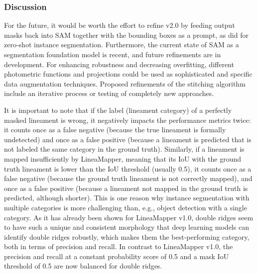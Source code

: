\subsubsection{Discussion}\label{sec:discussing_lineaMapperv1.1}
For the future, it would be worth the effort to refine v2.0 by feeding output masks back into SAM together with the bounding boxes as a prompt, as did for zero-shot instance segmentation. Furthermore, the current state of SAM as a segmentation foundation model is recent, and future refinements are in development.
For enhancing robustness and decreasing overfitting, different photometric functions and projections could be used as sophisticated and specific data augmentation techniques. Proposed refinements of the stitching algorithm include an iterative process or testing of completely new approaches. 

It is important to note that if the label (lineament category) of a perfectly masked lineament is wrong, it negatively impacts the performance metrics twice: it counts once as a false negative (because the true lineament is formally undetected) and once as a false positive (because a lineament is predicted that is not labeled the same category in the ground truth). Similarly, if a lineament is mapped insufficiently by LineaMapper, meaning that its IoU with the ground truth lineament is lower than the IoU threshold (usually 0.5), it counts once as a false negative (because the ground truth lineament is not correctly mapped), and once as a false positive (because a lineament not mapped in the ground truth is predicted, although shorter). This is one reason why instance segmentation with multiple categories is more challenging than, e.g., object detection with a single category. 
As it has already been shown for LineaMapper v1.0, double ridges seem to have such a unique and consistent morphology that deep learning models can identify double ridges robustly, which makes them the best-performing category, both in terms of precision and recall. In contrast to LineaMapper v1.0, the precision and recall at a constant probability score of 0.5 and a mask IoU threshold of 0.5 are now balanced for double ridges. 


